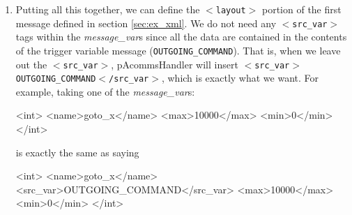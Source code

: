 \documentclass[11pt, letterpaper, oneside]{memoir}
\newcommand{\xmltag}[1]{\texttt{$<$#1$>$}}
\begin{document}
\begin{enumerate}
\item Putting all this together, we can define the \xmltag{layout} portion of the first message defined in section \ref{sec:ex_xml}. We do not need any \xmltag{src\_var} tags within the \textit{message\_var}s since all the data are contained in the contents of the trigger variable message (\verb|OUTGOING_COMMAND|). That is, when we leave out the \xmltag{src\_var}, pAcommsHandler will insert \xmltag{src\_var$>$OUTGOING\_COMMAND$<$/src\_var}, which is exactly what we want. For example, taking one of the \textit{message\_var}s:
\begin{small}
\begin{boxedverbatim}
      <int>
        <name>goto_x</name>
        <max>10000</max>
        <min>0</min>
      </int>
\end{boxedverbatim}
\resetbvlinenumber
\end{small}
is exactly the same as saying 
\begin{small}
\begin{boxedverbatim}
      <int>
        <name>goto_x</name>
        <src_var>OUTGOING_COMMAND</src_var>
        <max>10000</max>
        <min>0</min>
      </int>
\end{boxedverbatim}
\resetbvlinenumber
\end{small}


\end{enumerate}
\end{document}
